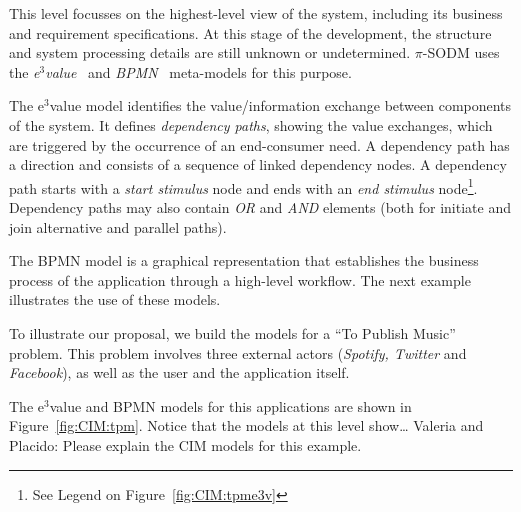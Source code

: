 This level focusses on the highest-level view of the system, including its business and requirement specifications.
At this stage of the development, the structure and system processing details are still unknown or undetermined.  
$\pi$-SODM uses the \textit{e$^3$value}~\cite{e3value} and \textit{BPMN}~\cite{BPMN} meta-models for this purpose. 

The e$^3$value model identifies the value/information exchange between components of the system. 
It defines \textit{dependency paths}, showing the value exchanges, which are triggered by the occurrence of an end-consumer need.
A dependency path has a direction and consists of a sequence of linked dependency nodes.
A dependency path starts with a \textit{start stimulus} node and ends with an \textit{end stimulus} node\footnote{See Legend on Figure~\ref{fig:CIM:tpme3v}}. 
Dependency paths may also contain \textsl{OR} and \textsl{AND} elements (both for initiate and join alternative and parallel paths).

The BPMN model is a graphical representation that establishes the business process of the application through a high-level workflow. The next example illustrates the use of these models.

\begin{example}\label{ex:toPublicMusic}
To illustrate our proposal, we build the models for a ``To Publish Music'' problem. 
This problem involves three external actors ({\em Spotify, Twitter} and {\em Facebook}), as well as the user and the application itself.

The e$^3$value and BPMN models for this applications are shown in Figure~\ref{fig:CIM:tpm}.
Notice that the models at this level show\dots 
{\color{red} Valeria and Placido: Please explain the CIM models for this example.}
\end{example}

